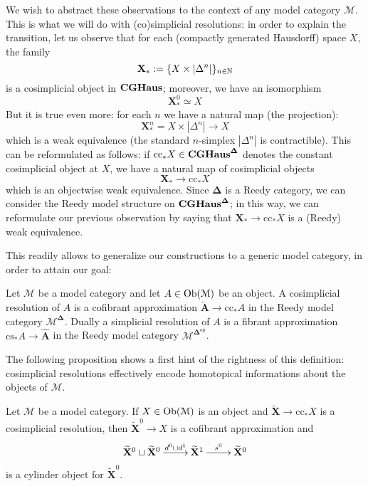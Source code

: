 \begin{refsection}
We wish to abstract these observations to the context of any model category $\mathcal M$. This is what we will do with (co)simplicial resolutions: in order to explain the transition, let us observe that for each (compactly generated Hausdorff) space $X$, the family
\[
\mathbf X_* := \{X \times |\Delta^n|\}_{n \in \mathbb{N}}
\]
is a cosimplicial object in $\mathbf{CGHaus}$; moreover, we have an isomorphism
\[
\mathbf X_*^0 \simeq X
\]
But it is true even more: for each $n$ we have a natural map (the projection):
\[
\mathbf X_*^n = X \times |\Delta^n| \to X
\]
which is a weak equivalence (the standard $n$-simplex $|\Delta^n|$ is contractible). This can be reformulated as follows: if $\mathrm{cc}_* X \in \mathbf{CGHaus}^{\mathbf \Delta}$ denotes the constant cosimplicial object at $X$, we have a natural map of cosimplicial objects
\[
\mathbf X_* \to \mathrm{cc}_*X
\]
which is an objectwise weak equivalence. Since $\mathbf \Delta$ is a Reedy category, we can consider the Reedy model structure on $\mathbf{CGHaus}^{\mathbf \Delta}$; in this way, we can reformulate our previous observation by saying that $\mathbf X_* \to \mathrm{cc}_*X$ is a (Reedy) weak equivalence.

This readily allows to generalize our constructions to a generic model category, in order to attain our goal:

\begin{defin}
Let $\mathcal M$ be a model category and let $A \in \operatorname{Ob}(\mathcal M)$ be an object. A cosimplicial resolution of $A$ is a cofibrant approximation $\widetilde{\mathbf A} \to \mathrm{cc}_* A$ in the Reedy model category $\mathcal M^{\mathbf \Delta}$. Dually a simplicial resolution of $A$ is a fibrant approximation $\mathrm{cs}_* A \to \widehat{\mathbf A}$ in the Reedy model category $\mathcal M^{\mathbf \Delta^{\mathrm{op}}}$.
\end{defin}

The following proposition shows a first hint of the rightness of this definition: cosimplicial resolutions effectively encode homotopical informations about the objects of $\mathcal M$.

\begin{prop} \label{prop cosimplicial resolution cylinder object}
Let $\mathcal M$ be a model category. If $X \in \operatorname{Ob}(\mathcal M)$ is an object and $\widetilde{\mathbf X} \to \mathrm{cc}_* X$ is a cosimplicial resolution, then $\widetilde{\mathbf X}^0 \to X$ is a cofibrant approximation and
\begin{equation} \label{eq cosimplicial resolution cylinder object}
\xymatrix{
\widetilde{\mathbf X}^0 \sqcup \widetilde{\mathbf X}^0 \ar[r]^-{d^0 \sqcup d^1} & \widetilde{\mathbf X}^1 \ar[r]^{s^0} & \widetilde{\mathbf X}^0
}
\end{equation}
is a cylinder object for $\widetilde{\mathbf X}^0$.
\end{prop}


\end{refsection}
